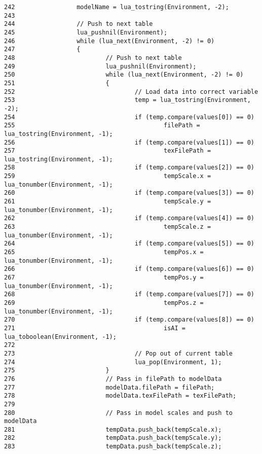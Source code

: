 \begin{Code}
\begin{verbatim}
242                 modelName = lua_tostring(Environment, -2);
243                 
244                 // Push to next table
245                 lua_pushnil(Environment);
246                 while (lua_next(Environment, -2) != 0)
247                 {
248                         // Push to next table
249                         lua_pushnil(Environment);
250                         while (lua_next(Environment, -2) != 0)
251                         {
252                                 // Load data into correct variable
253                                 temp = lua_tostring(Environment, -2);
254                                 if (temp.compare(values[0]) == 0)
255                                         filePath = lua_tostring(Environment, -1);
256                                 if (temp.compare(values[1]) == 0)
257                                         texFilePath = lua_tostring(Environment, -1);
258                                 if (temp.compare(values[2]) == 0)
259                                         tempScale.x = lua_tonumber(Environment, -1);
260                                 if (temp.compare(values[3]) == 0)
261                                         tempScale.y = lua_tonumber(Environment, -1);
262                                 if (temp.compare(values[4]) == 0)
263                                         tempScale.z = lua_tonumber(Environment, -1);
264                                 if (temp.compare(values[5]) == 0)
265                                         tempPos.x = lua_tonumber(Environment, -1);
266                                 if (temp.compare(values[6]) == 0)
267                                         tempPos.y = lua_tonumber(Environment, -1);
268                                 if (temp.compare(values[7]) == 0)
269                                         tempPos.z = lua_tonumber(Environment, -1);
270                                 if (temp.compare(values[8]) == 0)
271                                         isAI = lua_toboolean(Environment, -1);
272 
273                                 // Pop out of current table
274                                 lua_pop(Environment, 1);
275                         }       
276                         // Pass in filePath to modelData
277                         modelData.filePath = filePath;
278                         modelData.texFilePath = texFilePath;
279 
280                         // Pass in model scales and push to modelData
281                         tempData.push_back(tempScale.x);
282                         tempData.push_back(tempScale.y);
283                         tempData.push_back(tempScale.z);

\end{verbatim}
\end{Code}
